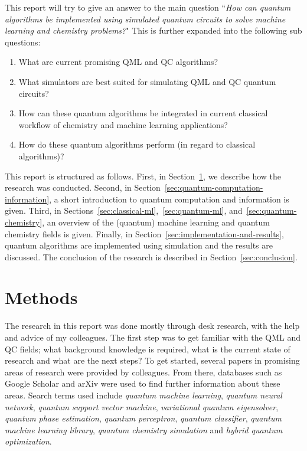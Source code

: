 \documentclass[a4paper,10pt]{article}
\begin{document}
This report will try to give an answer to the main question ``\emph{How can quantum algorithms be implemented using simulated quantum circuits to solve machine learning and chemistry problems?}"
This is further expanded into the following sub questions:
\begin{enumerate}
	\item What are current promising QML and QC algorithms?
	\item What simulators are best suited for simulating QML and QC quantum circuits?
	\item How can these quantum algorithms be integrated in current classical workflow of chemistry and machine learning applications?
	\item How do these quantum algorithms perform (in regard to classical algorithms)?
\end{enumerate}

This report is structured as follows. First, in Section~\ref{sec:methods}, we describe how the research was conducted.
Second, in Section~\ref{sec:quantum-computation-information}, a short introduction to quantum computation and information is given.
Third, in Sections~\ref{sec:classical-ml},~\ref{sec:quantum-ml}, and~\ref{sec:quantum-chemistry}, an overview of the (quantum) machine learning and quantum chemistry fields is given.
Finally, in Section~\ref{sec:implementation-and-results}, quantum algorithms are implemented using simulation and the results are discussed.
The conclusion of the research is described in Section~\ref{sec:conclusion}.

\section{Methods} \label{sec:methods}
The research in this report was done mostly through desk research, with the help and advice of my colleagues.
The first step was to get familiar with the QML and QC fields; what background knowledge is required, what is the current state of research and what are the next steps?
To get started, several papers in promising areas of research were provided by colleagues. 
From there, databases such as Google Scholar and arXiv were used to find further information about these areas.
Search terms used include \emph{quantum machine learning}, \emph{quantum neural network}, \emph{quantum support vector machine}, \emph{variational quantum eigensolver}, \emph{quantum phase estimation}, \emph{quantum perceptron}, \emph{quantum classifier}, \emph{quantum machine learning library}, \emph{quantum chemistry simulation} and \emph{hybrid quantum optimization}.
\end{document}
